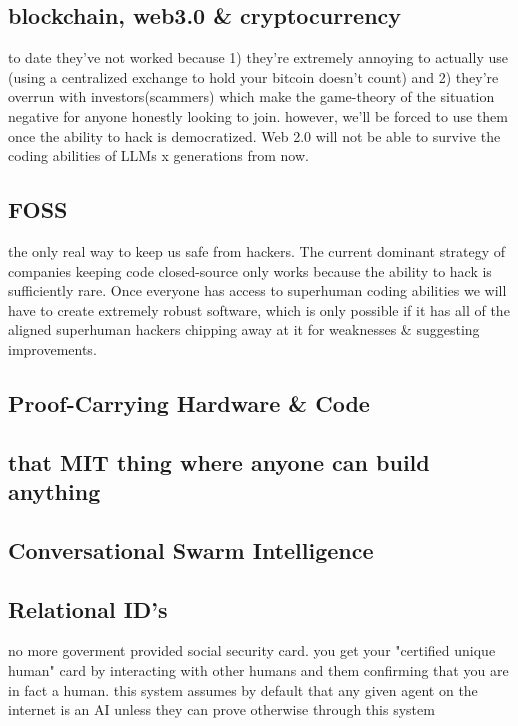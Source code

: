 \documentclass{article}
\begin{document}
\subsection{blockchain, web3.0 \& cryptocurrency}
to date they've not worked because 1) they're extremely annoying to actually use (using a centralized exchange to hold your bitcoin doesn't count) and 2) they're overrun with investors(scammers) which make the game-theory of the situation negative for anyone honestly looking to join. however, we'll be forced to use them once the ability to hack is democratized. Web 2.0 will not be able to survive the coding abilities of LLMs x generations from now. 

\subsection{FOSS}
the only real way to keep us safe from hackers. The current dominant strategy of companies keeping code closed-source only works because the ability to hack is sufficiently rare. Once everyone has access to superhuman coding abilities we will have to create extremely robust software, which is only possible if it has all of the aligned superhuman hackers chipping away at it for weaknesses \& suggesting improvements.

\subsection{Proof-Carrying Hardware \& Code}
\cite{tegmark2023provably}

\subsection{that MIT thing where anyone can build anything}

\subsection{Conversational Swarm Intelligence}

\subsection{Relational ID's}
no more goverment provided social security card. you get your "certified unique human" card by interacting with other humans and them confirming that you are in fact a human. this system assumes by default that any given agent on the internet is an AI unless they can prove otherwise through this system
\end{document}
